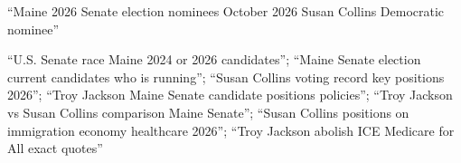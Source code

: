 \begin{description}\setlength{\itemsep}{2pt}
\item[GPT-6.1 Sol] ``Maine 2026 Senate election nominees October 2026 Susan Collins Democratic nominee''
\item[Grok 4.7] ``U.S. Senate race Maine 2024 or 2026 candidates''; ``Maine Senate election current candidates who is running''; ``Susan Collins voting record key positions 2026''; ``Troy Jackson Maine Senate candidate positions policies''; ``Troy Jackson vs Susan Collins comparison Maine Senate''; ``Susan Collins positions on immigration economy healthcare 2026''; ``Troy Jackson abolish ICE Medicare for All exact quotes''
\end{description}
